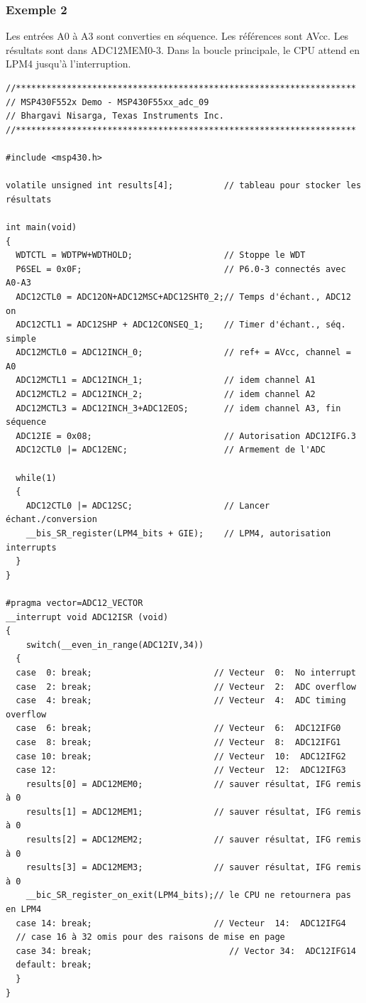 \begin{minipage}{16cm}{
\subsubsection*{Exemple 2}
Les entrées A0 à A3 sont converties en séquence. Les références sont AVcc.
Les résultats sont dans ADC12MEM0-3. Dans la boucle principale, le CPU attend en LPM4 jusqu'à l'interruption.

\lstset{style=customc}
\begin{lstlisting}
//*******************************************************************
// MSP430F552x Demo - MSP430F55xx_adc_09
// Bhargavi Nisarga, Texas Instruments Inc.
//*******************************************************************

#include <msp430.h>

volatile unsigned int results[4];          // tableau pour stocker les résultats

int main(void)
{
  WDTCTL = WDTPW+WDTHOLD;                  // Stoppe le WDT
  P6SEL = 0x0F;                            // P6.0-3 connectés avec A0-A3
  ADC12CTL0 = ADC12ON+ADC12MSC+ADC12SHT0_2;// Temps d'échant., ADC12 on
  ADC12CTL1 = ADC12SHP + ADC12CONSEQ_1;    // Timer d'échant., séq. simple
  ADC12MCTL0 = ADC12INCH_0;                // ref+ = AVcc, channel = A0
  ADC12MCTL1 = ADC12INCH_1;                // idem channel A1
  ADC12MCTL2 = ADC12INCH_2;                // idem channel A2
  ADC12MCTL3 = ADC12INCH_3+ADC12EOS;       // idem channel A3, fin séquence
  ADC12IE = 0x08;                          // Autorisation ADC12IFG.3
  ADC12CTL0 |= ADC12ENC;                   // Armement de l'ADC

  while(1)
  {
    ADC12CTL0 |= ADC12SC;                  // Lancer échant./conversion
    __bis_SR_register(LPM4_bits + GIE);    // LPM4, autorisation interrupts
  }
}

#pragma vector=ADC12_VECTOR
__interrupt void ADC12ISR (void)
{
    switch(__even_in_range(ADC12IV,34))
  {
  case  0: break;                        // Vecteur  0:  No interrupt
  case  2: break;                        // Vecteur  2:  ADC overflow
  case  4: break;                        // Vecteur  4:  ADC timing overflow
  case  6: break;                        // Vecteur  6:  ADC12IFG0
  case  8: break;                        // Vecteur  8:  ADC12IFG1
  case 10: break;                        // Vecteur  10:  ADC12IFG2
  case 12:                               // Vecteur  12:  ADC12IFG3
    results[0] = ADC12MEM0;              // sauver résultat, IFG remis à 0
    results[1] = ADC12MEM1;              // sauver résultat, IFG remis à 0
    results[2] = ADC12MEM2;              // sauver résultat, IFG remis à 0
    results[3] = ADC12MEM3;              // sauver résultat, IFG remis à 0
    __bic_SR_register_on_exit(LPM4_bits);// le CPU ne retournera pas en LPM4  
  case 14: break;                        // Vecteur  14:  ADC12IFG4
  // case 16 à 32 omis pour des raisons de mise en page
  case 34: break;                           // Vector 34:  ADC12IFG14
  default: break; 
  }
}
\end{lstlisting}
}
\end{minipage}

